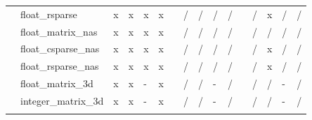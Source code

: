 \documentclass{article}
\begin{document}
\begin{longtable}{llllllllllllllll}
                & float\_rsparse            & \cellcolor[HTML]{B7E1CD}x & \cellcolor[HTML]{B7E1CD}x & \cellcolor[HTML]{B7E1CD}x & \cellcolor[HTML]{B7E1CD}x &  & \cellcolor[HTML]{F4CCCC}/ & \cellcolor[HTML]{F4CCCC}/ & \cellcolor[HTML]{F4CCCC}/ & \cellcolor[HTML]{F4CCCC}/ &  & \cellcolor[HTML]{F4CCCC}/ & \cellcolor[HTML]{B7E1CD}x & \cellcolor[HTML]{F4CCCC}/ & \cellcolor[HTML]{F4CCCC}/ \\
                & float\_matrix\_nas        & \cellcolor[HTML]{B7E1CD}x & \cellcolor[HTML]{B7E1CD}x & \cellcolor[HTML]{B7E1CD}x & \cellcolor[HTML]{B7E1CD}x &  & \cellcolor[HTML]{F4CCCC}/ & \cellcolor[HTML]{F4CCCC}/ & \cellcolor[HTML]{F4CCCC}/ & \cellcolor[HTML]{F4CCCC}/ &  & \cellcolor[HTML]{F4CCCC}/ & \cellcolor[HTML]{F4CCCC}/ & \cellcolor[HTML]{F4CCCC}/ & \cellcolor[HTML]{F4CCCC}/ \\
                & float\_csparse\_nas       & \cellcolor[HTML]{B7E1CD}x & \cellcolor[HTML]{B7E1CD}x & \cellcolor[HTML]{B7E1CD}x & \cellcolor[HTML]{B7E1CD}x &  & \cellcolor[HTML]{F4CCCC}/ & \cellcolor[HTML]{F4CCCC}/ & \cellcolor[HTML]{F4CCCC}/ & \cellcolor[HTML]{F4CCCC}/ &  & \cellcolor[HTML]{F4CCCC}/ & \cellcolor[HTML]{B7E1CD}x & \cellcolor[HTML]{F4CCCC}/ & \cellcolor[HTML]{F4CCCC}/ \\
                & float\_rsparse\_nas       & \cellcolor[HTML]{B7E1CD}x & \cellcolor[HTML]{B7E1CD}x & \cellcolor[HTML]{B7E1CD}x & \cellcolor[HTML]{B7E1CD}x &  & \cellcolor[HTML]{F4CCCC}/ & \cellcolor[HTML]{F4CCCC}/ & \cellcolor[HTML]{F4CCCC}/ & \cellcolor[HTML]{F4CCCC}/ &  & \cellcolor[HTML]{F4CCCC}/ & \cellcolor[HTML]{B7E1CD}x & \cellcolor[HTML]{F4CCCC}/ & \cellcolor[HTML]{F4CCCC}/ \\
                & float\_matrix\_3d         & \cellcolor[HTML]{B7E1CD}x & \cellcolor[HTML]{B7E1CD}x & \cellcolor[HTML]{CFE2F3}- & \cellcolor[HTML]{B7E1CD}x &  & \cellcolor[HTML]{F4CCCC}/ & \cellcolor[HTML]{F4CCCC}/ & \cellcolor[HTML]{CFE2F3}- & \cellcolor[HTML]{F4CCCC}/ &  & \cellcolor[HTML]{F4CCCC}/ & \cellcolor[HTML]{F4CCCC}/ & \cellcolor[HTML]{CFE2F3}- & \cellcolor[HTML]{F4CCCC}/ \\
                & integer\_matrix\_3d       & \cellcolor[HTML]{B7E1CD}x & \cellcolor[HTML]{B7E1CD}x & \cellcolor[HTML]{CFE2F3}- & \cellcolor[HTML]{B7E1CD}x &  & \cellcolor[HTML]{F4CCCC}/ & \cellcolor[HTML]{F4CCCC}/ & \cellcolor[HTML]{CFE2F3}- & \cellcolor[HTML]{F4CCCC}/ &  & \cellcolor[HTML]{F4CCCC}/ & \cellcolor[HTML]{F4CCCC}/ & \cellcolor[HTML]{CFE2F3}- & \cellcolor[HTML]{F4CCCC}/ \\
                &                           &                           &                           &                           &                           &  &                           &                           &                           &                           &  &                           &                           &                           &                           \\

\end{longtable}
\end{document}
